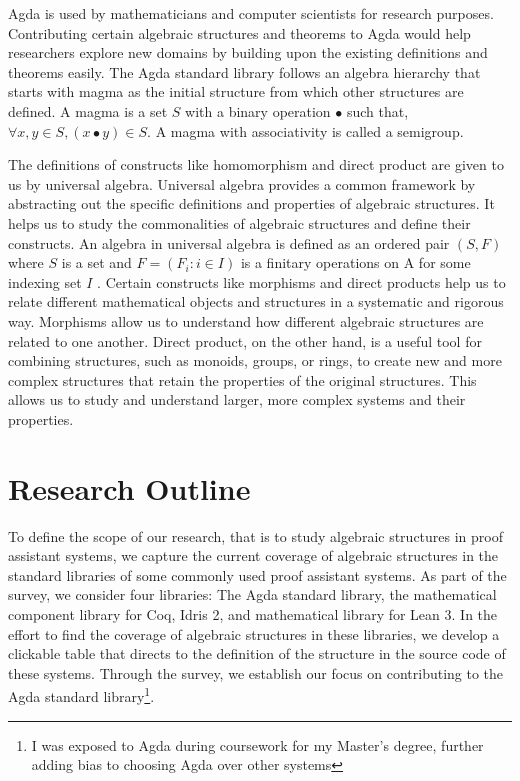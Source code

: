 Agda is used by mathematicians and computer scientists for research purposes.
Contributing certain algebraic structures and theorems to Agda would help
researchers explore new domains by building upon the existing definitions and
theorems easily. The Agda standard library follows an algebra hierarchy that
starts with magma as the initial structure from which other structures are
defined. A magma is a set $S$ with a binary operation $∙$ such that, $\forall
x,y \in S, (x ∙ y) \in S$. A magma with associativity is called a semigroup.

The definitions of constructs like homomorphism and direct product are given to
us by universal algebra. Universal algebra provides a common framework by
abstracting out the specific definitions and properties of algebraic structures.
It helps us to study the commonalities of algebraic structures and define their
constructs. An algebra in universal algebra is defined as an ordered pair
$(S,F)$ where $S$ is a set and $F = (F_i:i\in I)$ is a finitary operations on A
for some indexing set $I$ \cite{sannella2012foundations}. Certain constructs
like morphisms and direct products help us to relate different mathematical
objects and structures in a systematic and rigorous way. Morphisms allow us to
understand how different algebraic structures are related to one another. Direct
product, on the other hand, is a useful tool for combining structures, such as
monoids, groups, or rings, to create new and more complex structures that retain
the properties of the original structures. This allows us to study and
understand larger, more complex systems and their properties.

\section{Research Outline}
To define the scope of our research, that is to study algebraic structures in
proof assistant systems, we capture the current coverage of algebraic structures
in the standard libraries of some commonly used proof assistant systems. As part
of the survey, we consider four libraries: The Agda standard library, the
mathematical component library for Coq, Idris 2, and mathematical library for
Lean 3. In the effort to find the coverage of algebraic structures in these
libraries, we develop a clickable table that directs to the definition of the
structure in the source code of these systems. Through the survey, we establish
our focus on contributing to the Agda standard library\footnote{I was exposed to
Agda during coursework for my Master's degree, further adding bias to choosing
Agda over other systems}.

